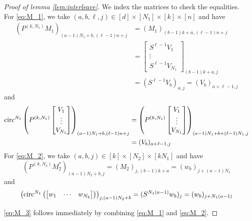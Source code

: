\begin{proof}[Proof of lemma \ref{lem:interleave}]
  We index the matrices to check the equalities.  For \eqref{eq:M_1}, we take $(a, b, \ell, j) \in [d] \times [N_1] \times [k] \times [n]$ and have \begin{align*}
    (P^{(k, N_1)} M_1)_{(a-1)N_1 + b, (\ell - 1) n + j} &= (M_1)_{(b - 1) k + a, (\ell - 1)n + j} \\ &= \begin{bmatrix} S^{\ell - 1} V_1 \\ \vdots \\ S^{\ell - 1} V_{N_1} \end{bmatrix}_{(b - 1)k + a, j} \\ &= (S^{\ell - 1}V_b)_{a, j} = (V_b)_{a + \ell - 1, j}
  \end{align*}
  and
  \begin{align*}
    \circop^{N_1}\left(P^{(k, N_1)} \begin{bmatrix} V_1 \\ \vdots \\ V_{N_1} \end{bmatrix}\right)_{(a-1)N_1 + b, (\ell - 1) n + j} &= \left(P^{(k, N_1)} \begin{bmatrix} V_1 \\ \vdots \\ V_{N_1} \end{bmatrix}\right)_{(a - 1)N_1 + b + (\ell-1)N_1, j} \\
    &= %
    (V_b)_{a + \ell - 1, j}
  \end{align*}
  For \eqref{eq:M_2}, we take $(a, b, j) \in [k] \times [N_2] \times [k N_1]$ and have
 \[(P^{(k, N_2)} M_2^*)_{(a - 1)N_2 + b, j} = (M_2)_{j, (b - 1) k + a} = (w_b)_{j + (a - 1)N_1}\]
  and
  \[\left(\operatorname{circ}^{N_1}\left(\begin{bmatrix} w_1 & \cdots & w_{N_2} \end{bmatrix}\right)\right)_{j, (a - 1)N_2 + b} = (S^{N_1(a - 1)} w_b)_j = (w_b)_{j + N_1(a - 1)}\]

  \eqref{eq:M_3} follows immediately by combining \eqref{eq:M_1} and \eqref{eq:M_2}.
\end{proof}

